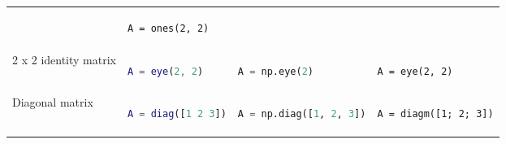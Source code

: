 \documentclass[10pt, landscape]{article}
\begin{document}
\begin{multicols}{2}
\begin{tabular}[]{@{}llll@{}}
\begin{minipage}[t]{0.25\columnwidth}
\end{minipage} & \begin{minipage}[t]{0.20\columnwidth}\raggedright
\begin{lstlisting}
A = ones(2, 2)
\end{lstlisting}

\end{minipage}\tabularnewline
\begin{minipage}[t]{0.24\columnwidth}\raggedright
2 x 2 identity matrix
\end{minipage} & \begin{minipage}[t]{0.20\columnwidth}\raggedright
\begin{lstlisting}[language=Matlab]
A = eye(2, 2)
\end{lstlisting}

\end{minipage} & \begin{minipage}[t]{0.25\columnwidth}\raggedright
\begin{lstlisting}[language=Python]
A = np.eye(2)
\end{lstlisting}

\end{minipage} & \begin{minipage}[t]{0.20\columnwidth}\raggedright
\begin{lstlisting}
A = eye(2, 2)
\end{lstlisting}

\end{minipage}\tabularnewline
\begin{minipage}[t]{0.24\columnwidth}\raggedright
Diagonal matrix
\end{minipage} & \begin{minipage}[t]{0.20\columnwidth}\raggedright
\begin{lstlisting}[language=Matlab]
A = diag([1 2 3])
\end{lstlisting}

\end{minipage} & \begin{minipage}[t]{0.25\columnwidth}\raggedright
\begin{lstlisting}[language=Python]
A = np.diag([1, 2, 3])
\end{lstlisting}

\end{minipage} & \begin{minipage}[t]{0.20\columnwidth}\raggedright
\begin{lstlisting}
A = diagm([1; 2; 3])
\end{lstlisting}


\end{minipage}
\end{tabular}
\end{multicols}
\end{document}
